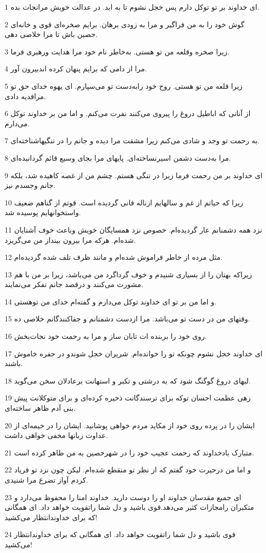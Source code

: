 \par 1 ای خداوند بر تو توکل دارم پس خجل نشوم تا به ابد. در عدالت خویش مرانجات بده.
\par 2 گوش خود را به من فراگیر و مرا به زودی برهان. برایم صخره‌ای قوی و خانه‌ای حصین باش تا مرا خلاصی دهی.
\par 3 زیرا صخره وقلعه من تو هستی. به‌خاطر نام خود مرا هدایت ورهبری فرما.
\par 4 مرا از دامی که برایم پنهان کرده اندبیرون آور.
\par 5 زیرا قلعه من تو هستی. روح خود رابه‌دست تو می‌سپارم. ای یهوه خدای حق تو مرافدیه دادی.
\par 6 از آنانی که اباطیل دروغ را پیروی می‌کنند نفرت می‌کنم. و اما من بر خداوند توکل می‌دارم.
\par 7 به رحمت تو وجد و شادی می‌کنم زیرا مشقت مرا دیده و جانم را در تنگیهاشناخته‌ای.
\par 8 مرا به‌دست دشمن اسیرنساخته‌ای. پایهای مرا بجای وسیع قائم گردانیده‌ای.
\par 9 ‌ای خداوند بر من رحمت فرما زیرا در تنگی هستم. چشم من از غصه کاهیده شد، بلکه جانم وجسدم نیز.
\par 10 زیرا که حیاتم از غم و سالهایم ازناله فانی گردیده است. قوتم از گناهم ضعیف واستخوانهایم پوسیده شد.
\par 11 نزد همه دشمنانم عار گردیده‌ام. خصوص نزد همسایگان خویش وباعث خوف آشنایان شده‌ام. هرکه مرا بیرون بینداز من می‌گریزد.
\par 12 مثل مرده از خاطر فراموش شده‌ام و مانند ظرف تلف شده گردیده‌ام.
\par 13 زیراکه بهتان را از بسیاری شنیدم و خوف گرداگرد من می‌باشد، زیرا بر من با هم مشورت می‌کنند و درقصد جانم تفکر می‌نمایند.
\par 14 و اما من بر تو ای خداوند توکل می‌دارم و گفته‌ام خدای من توهستی.
\par 15 وقتهای من در دست تو می‌باشد. مرا ازدست دشمنانم و جفاکنندگانم خلاصی ده.
\par 16 روی خود را بربنده ات تابان ساز و مرا به رحمت خود نجات‌بخش.
\par 17 ‌ای خداوند خجل نشوم چونکه تو را خوانده‌ام. شریران خجل شوندو در حفره خاموش باشند.
\par 18 لبهای دروغ گوگنگ شود که به درشتی و تکبر و استهانت برعادلان سخن می‌گوید.
\par 19 زهی عظمت احسان توکه برای ترسندگانت ذخیره کرده‌ای و برای متوکلانت پیش بنی آدم ظاهر ساخته‌ای.
\par 20 ایشان را در پرده روی خود از مکاید مردم خواهی پوشانید. ایشان را در خیمه‌ای از عداوت زبانها مخفی خواهی داشت.
\par 21 متبارک بادخداوند که رحمت عجیب خود را در شهرحصین به من ظاهر کرده است.
\par 22 و اما من درحیرت خود گفتم که از نظر تو منقطع شده‌ام. لیکن چون نزد تو فریاد کردم آواز تضرع مرا شنیدی.
\par 23 ‌ای جمیع مقدسان خداوند او را دوست دارید. خداوند امنا را محفوظ می‌دارد و متکبران رامجازات کثیر می‌دهد.قوی باشید و دل شما راتقویت خواهد داد. ای همگانی که برای خداوندانتظار می‌کشید!
\par 24 قوی باشید و دل شما راتقویت خواهد داد. ای همگانی که برای خداوندانتظار می‌کشید!
 
